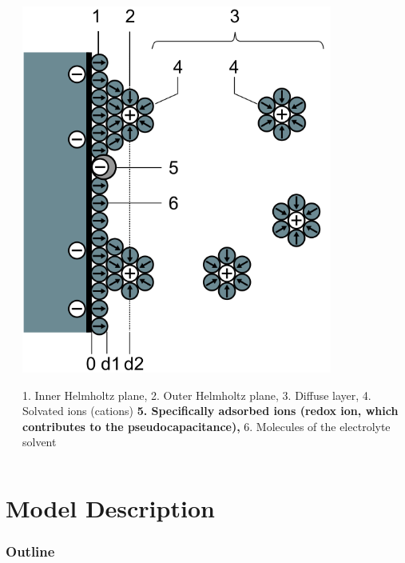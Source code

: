 \documentclass[10pt,xcolor=dvipsnames,compress]{beamer}
\begin{document}
\begin{frame}
\begin{columns}[T]
\begin{column}[T]{5.5cm}
\begin{block}{}
\begin{itemize}
\end{itemize}
\end{block}
     \end{column}
     \begin{column}[T]{5cm} 
	\includegraphics[trim = 0mm 0mm 0mm 0mm, clip, width=0.8\textwidth]{figs/double-layer.png}\\
\begin{footnotesize}
	 1. Inner Helmholtz plane, 
	 2. Outer Helmholtz plane, 
	 3. Diffuse layer, 
	 4. Solvated ions (cations) 
	 \textbf{5. Specifically adsorbed ions (redox ion, which contributes to the pseudocapacitance),} 
	 6. Molecules of the electrolyte solvent
\end{footnotesize}
     \end{column}
\end{columns}



\vfill
\end{frame}


\section{Model Description}
\begin{frame}
\frametitle{Outline}
\vfill

\vspace{0.7in}
\vspace{0.7in}

\vfill
\end{frame}
\end{document}
